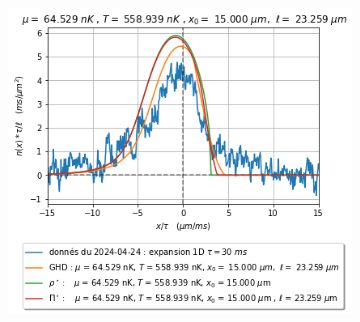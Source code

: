 \documentclass[a3, 10pt,twoside]{article}          %
\theoremstyle{plain}
\theoremstyle{definition}
\theoremstyle{remark}
\theoremstyle{definition} %
\begin{document}
\begin{figure}[H]
\begin{subfigure}[b]{0.32\textwidth}
        \caption{}
        \label{fig:expansion_1_expansion}
    \end{subfigure}
    \hfill
    \begin{subfigure}[b]{0.32\textwidth}
        \centering
        \includegraphics[width=\textwidth]{Figures/simul_expansion_30_expansion_15}
        \caption{}
        \label{}
    \end{subfigure}
    
    \vspace{1em}
    

\end{figure}
\end{document}
